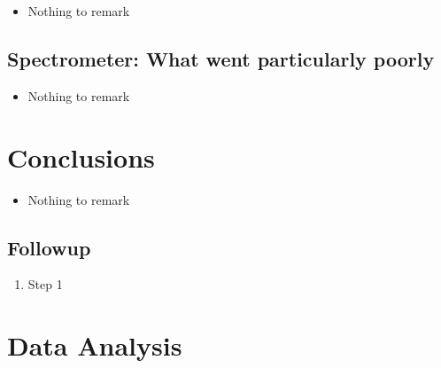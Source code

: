 \begin{itemize}
\item{Nothing to remark}
\end{itemize}

\subsection{Spectrometer: {\color{red} What went particularly poorly}}

\begin{itemize}
\item{Nothing to remark}
\end{itemize}


\section{Conclusions}

\begin{itemize}
\item{Nothing to remark}
\end{itemize}


\subsection{Followup}


\begin{enumerate}
\item{Step 1}
\end{enumerate}

\newpage

\section{Data Analysis}


